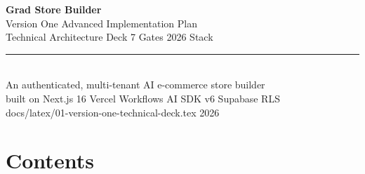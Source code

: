 \documentclass[11pt,landscape,a4paper]{article}
\begin{document}
\thispagestyle{empty}
\begin{tcolorbox}[
  enhanced, sharp corners, boxrule=0pt,
  colback=NavyDeep, coltext=white,
  left=20pt, right=20pt, top=40pt, bottom=40pt,
  width=\textwidth, height=\textheight,
  valign=center
]
\centering
{\fontsize{42pt}{50pt}\selectfont\bfseries Grad Store Builder}\\[6pt]
{\fontsize{22pt}{28pt}\selectfont\color{Teal} Version One \textbar{} Advanced Implementation Plan}\\[24pt]
{\Large\color{white!85!NavyDeep} Technical Architecture Deck \textbar{} 7 Gates \textbar{} 2026 Stack}\\[40pt]
\rule{160pt}{1pt}\\[14pt]
{\large An authenticated, multi-tenant AI e-commerce store builder}\\[4pt]
{\large built on Next.js 16 \textbullet{} Vercel Workflows \textbullet{} AI SDK v6 \textbullet{} Supabase RLS}\\[80pt]
{\small\color{Teal!70!white}\ttfamily docs/latex/01-version-one-technical-deck.tex \textbullet{} 2026}
\end{tcolorbox}

\newpage

\section*{\color{NavyDeep}Contents}
\vspace{6pt}
\end{document}
